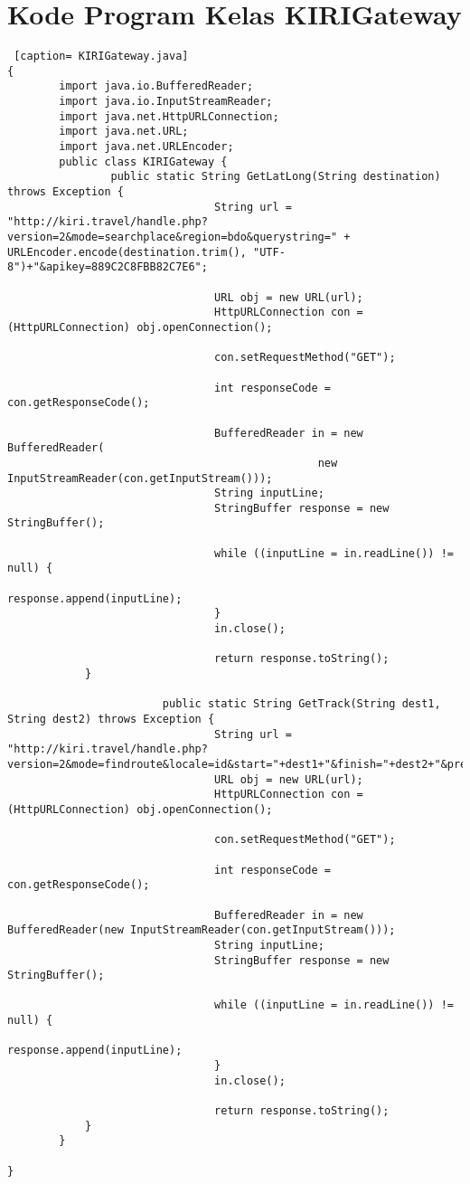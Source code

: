 \chapter{Kode Program Kelas KIRIGateway}
\label{Kode Program Kelas KIRIGateway}

\begin{lstlisting} [caption= KIRIGateway.java]
{ 
		import java.io.BufferedReader;
		import java.io.InputStreamReader;
		import java.net.HttpURLConnection;
		import java.net.URL;
		import java.net.URLEncoder;
		public class KIRIGateway {
				public static String GetLatLong(String destination) throws Exception {
								String url = "http://kiri.travel/handle.php?version=2&mode=searchplace&region=bdo&querystring=" + URLEncoder.encode(destination.trim(), "UTF-8")+"&apikey=889C2C8FBB82C7E6";

								URL obj = new URL(url);
								HttpURLConnection con = (HttpURLConnection) obj.openConnection();

								con.setRequestMethod("GET");

								int responseCode = con.getResponseCode();

								BufferedReader in = new BufferedReader(
												new InputStreamReader(con.getInputStream()));
								String inputLine;
								StringBuffer response = new StringBuffer();

								while ((inputLine = in.readLine()) != null) {
												response.append(inputLine);
								}
								in.close();

								return response.toString();
			}
						
						public static String GetTrack(String dest1, String dest2) throws Exception {
								String url = "http://kiri.travel/handle.php?version=2&mode=findroute&locale=id&start="+dest1+"&finish="+dest2+"&presentation=desktop&apikey=889C2C8FBB82C7E6";
								URL obj = new URL(url);
								HttpURLConnection con = (HttpURLConnection) obj.openConnection();

								con.setRequestMethod("GET");

								int responseCode = con.getResponseCode();

								BufferedReader in = new BufferedReader(new InputStreamReader(con.getInputStream()));
								String inputLine;
								StringBuffer response = new StringBuffer();

								while ((inputLine = in.readLine()) != null) {
												response.append(inputLine);
								}
								in.close();

								return response.toString();
			}
		}

}
\end{lstlisting}